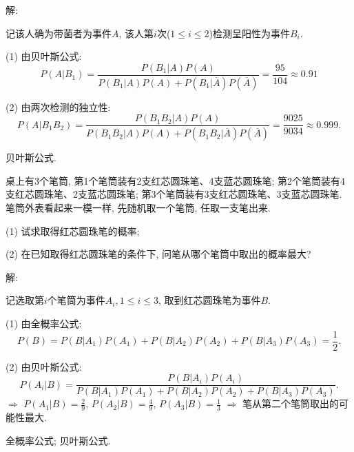 \documentclass[standard]{ExBook}
\begin{document}
\begin{qitems}
\vspace{-5em}

    \begin{bbox}
解: 

记该人确为带菌者为事件$A$, 该人第$i$次($1 \leq i \leq 2$)检测呈阳性为事件$B_{i}$.

(1) 由贝叶斯公式:
$$P(A|B_{1})=\frac{P(B_{1}|A)P(A)}{P(B_{1}|A)P(A)+P(B_{1}|\overline{A})P(\overline{A})}=\frac{95}{104}\approx0.91$$

(2) 由两次检测的独立性:
$$P(A|B_{1}B_{2})=\frac{P(B_{1}B_{2}|A)P(A)}{P(B_{1}B_{2}|A)P(A)+P(B_{1}B_{2}|\overline{A})P(\overline{A})}=\frac{9025}{9034}\approx0.999.$$

\textcolor{themeColor}{\selectfont {} 贝叶斯公式.}
    \end{bbox}

\vspace{-5em}

    \begin{bbox}
    \begin{shaded}
        \qitem
桌上有3个笔筒, 第1个笔筒装有2支红芯圆珠笔、4支蓝芯圆珠笔; 第2个笔筒装有4支红芯圆珠笔、2支蓝芯圆珠笔; 第3个笔筒装有3支红芯圆珠笔、3支蓝芯圆珠笔. 笔筒外表看起来一模一样, 先随机取一个笔筒, 任取一支笔出来.

(1) 试求取得红芯圆珠笔的概率;

(2) 在已知取得红芯圆珠笔的条件下, 问笔从哪个笔筒中取出的概率最大?
    \end{shaded}
    \end{bbox}

\vspace{-5em}

    \begin{bbox}
解: 

记选取第$i$个笔筒为事件$A_{i},1 \leq i \leq 3$, 取到红芯圆珠笔为事件$B$.

(1) 由全概率公式:
$$P(B)=P(B|A_{1})P(A_{1})+P(B|A_{2})P(A_{2})+P(B|A_{3})P(A_{3})=\frac{1}{2}.$$

(2) 由贝叶斯公式:
$$P(A_{i}|B)=\frac{P(B|A_{i})P(A_{i})}{P(B|A_{1})P(A_{1})+P(B|A_{2})P(A_{2})+P(B|A_{3})P(A_{3})}.$$
$\Longrightarrow$ $P(A_{1}|B)=\frac{2}{9}$, $P(A_{2}|B)=\frac{4}{9}$, $P(A_{3}|B)=\frac{1}{3}$ $\Longrightarrow$ 笔从第二个笔筒取出的可能性最大.

\textcolor{themeColor}{\selectfont {} 全概率公式; 贝叶斯公式.}
    \end{bbox}

\vspace{-5em}


\end{qitems}
\end{document}
